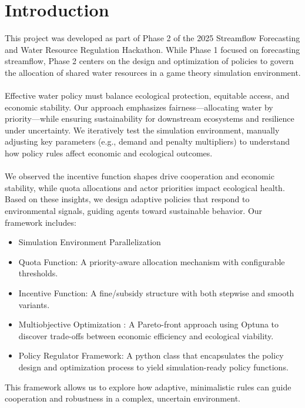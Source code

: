 \documentclass[a4paper, 12pt]{article}
\begin{document}
\section{Introduction}
This project was developed as part of Phase 2 of the 2025 Streamflow Forecasting and Water 
Resource Regulation Hackathon. While Phase 1 focused on forecasting streamflow, Phase 2 
centers on the design and optimization of policies to govern the allocation of shared 
water resources in a game theory simulation environment.
\\ \\
Effective water policy must balance ecological protection, equitable access, and economic stability. 
Our approach emphasizes fairness—allocating water by priority—while ensuring sustainability for downstream ecosystems and resilience under uncertainty.
We iteratively test the simulation environment, manually adjusting key parameters (e.g., demand and penalty multipliers) 
to understand how policy rules affect economic and ecological outcomes. 
\\ \\
We observed the incentive function shapes drive cooperation and economic stability, while quota allocations and actor priorities impact ecological health.
Based on these insights, we design adaptive policies that respond to environmental signals, guiding agents toward 
sustainable behavior. Our framework includes:
\begin{itemize}
    \item Simulation Environment Parallelization
    \item Quota Function: A priority-aware allocation mechanism with configurable thresholds.
    \item Incentive Function: A fine/subsidy structure with both stepwise and smooth variants.
    \item Multiobjective Optimization : A Pareto-front approach using Optuna to discover trade-offs between economic efficiency and ecological viability.
    \item Policy Regulator Framework: A python class that encapsulates the policy design and optimization process to yield simulation-ready policy functions.  
\end{itemize}
\noindent This framework allows us to explore how adaptive, minimalistic rules can guide cooperation and robustness in a complex, uncertain environment.
\end{document}
